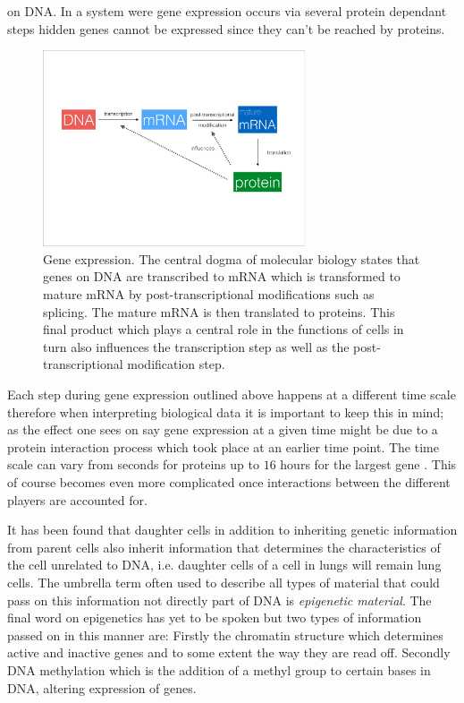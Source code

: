 on DNA. In a system were gene expression occurs via several protein dependant steps hidden genes cannot be expressed since they can't be reached by proteins. 

\begin{figure}[!t]
  \centering
  \includegraphics[width=0.69\textwidth]{pics/dogma-bio.pdf}
  \caption{Gene expression. The central dogma of molecular biology states that genes on DNA are transcribed to mRNA which is transformed to mature mRNA by post-transcriptional modifications such as splicing. The mature mRNA is then translated to proteins. This final product which plays a central role in the functions of cells in turn also influences the transcription step as well as the post-transcriptional modification step.}
  \label{fig:gene-expression}
\end{figure}

Each step during gene expression outlined above happens at a different time scale therefore when interpreting biological data it is important to keep this in mind; as the effect one sees on say gene expression at a given time might be due to a protein interaction process which took place at an earlier time point. The time scale can vary from seconds for proteins \citep{Herce:kq} up to $16$ hours for the largest gene \citep{Tennyson:1995dl}. This of course becomes even more complicated once interactions between the different players are accounted for.

It has been found that daughter cells in addition to inheriting genetic information from parent cells also inherit information that determines the characteristics of the cell unrelated to DNA, i.e. daughter cells of a cell in lungs will remain lung cells. The umbrella term often used to describe all types of material that could pass on this information not directly part of DNA is \emph{epigenetic material}. The final word on epigenetics has yet to be spoken but two types of information passed on in this manner are: Firstly the chromatin structure which determines active and inactive genes and to some extent the way they are read off. Secondly DNA methylation which is the addition of a methyl group to certain bases in DNA, altering expression of genes. 

